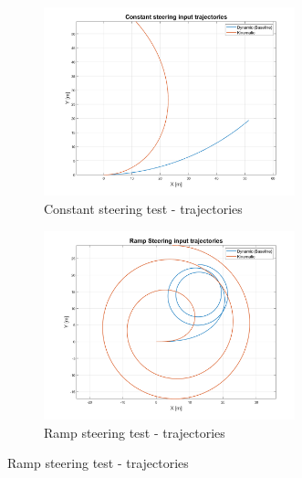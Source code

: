 \begin{figure}[H]
    \begin{subfigure}{.5\textwidth}
    \centering
   \includegraphics[width=0.8\textwidth,keepaspectratio]{Figures/Const_steer_traj.png}
   \caption{Constant steering test - trajectories}
   \label{subfig:const_steer}
    \end{subfigure}%
    \begin{subfigure}{.5\textwidth}
    \centering
    \includegraphics[width=0.8\textwidth,keepaspectratio]{Figures/Ramp_traj.png}
    \caption{Ramp steering test - trajectories}
    \label{subfig:ramp_steer}
    \end{subfigure}
    
     \vspace{10mm}
     

\end{figure}
